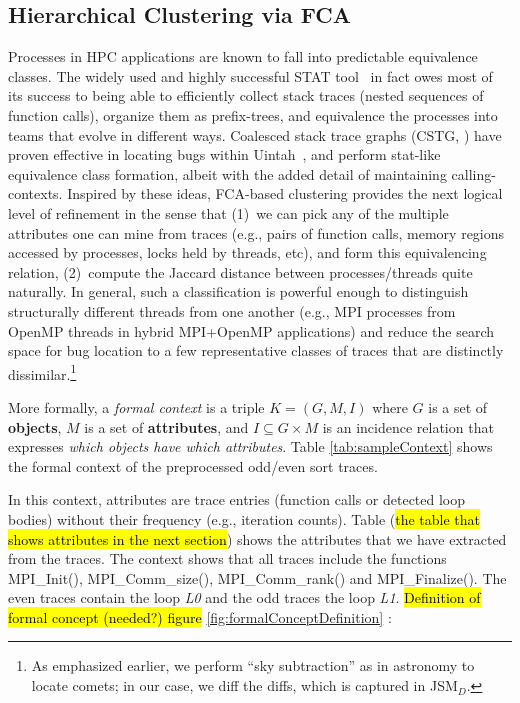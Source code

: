 \subsection{Hierarchical Clustering via FCA}
Processes in HPC applications are known to fall into predictable equivalence classes.
%
The widely used and highly successful STAT tool~\cite{stat} in fact owes most of its
success to being able to efficiently collect stack traces (nested sequences of function
calls), organize them as prefix-trees, and equivalence the processes into teams that
evolve in different ways.
%
Coalesced stack trace graphs (CSTG, \cite{cstg-journal-paper}) have proven effective in
locating bugs within Uintah~\cite{uintah}, and perform stat-like equivalence class formation,
albeit with the added detail of maintaining calling-contexts.
%
Inspired by these ideas, FCA-based clustering provides the next logical level of refinement
in the sense that (1)~we can pick any of the multiple attributes one can mine from traces (e.g.,
pairs of function calls, memory regions accessed by processes, locks held by threads, etc), and
form this equivalencing relation, (2)~compute the Jaccard distance between processes/threads
quite naturally.
%
In general,
such a classification is powerful enough to
distinguish structurally different threads from one another
(e.g., MPI processes from OpenMP threads in hybrid MPI+OpenMP applications)
and reduce the search space for bug location to a few representative classes of traces that
are distinctly dissimilar.\footnote{As emphasized earlier, we perform ``sky subtraction'' as
  in astronomy to locate comets; in our case, we diff the diffs, which is
  captured in JSM$_{D}$.}

More formally,
a \textit{formal context} is a triple $K = (G, M, I)$
where $G$ is a set of \textbf{objects},
$M$ is a set of \textbf{attributes},
and $I \subseteq G \times M$ is an incidence relation that expresses
\textit{which objects have which attributes}.
Table \ref{tab:sampleContext} shows the formal context of the preprocessed odd/even sort traces.


In this context, attributes are trace entries (function calls or detected loop bodies) without their frequency (e.g., iteration counts). Table (\hl{the table that shows attributes in the next section}) shows the attributes that we have extracted from the traces. The context shows that all traces include the functions MPI\_Init(), MPI\_Comm\_size(), MPI\_Comm\_rank() and MPI\_Finalize(). The even traces contain the loop \textit{L0} and the odd traces the loop \textit{L1}.
%
\hl{Definition of formal concept (needed?) figure }\ref{fig:formalConceptDefinition} :

